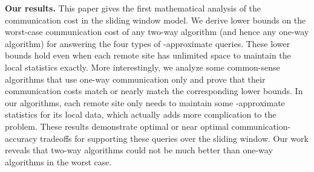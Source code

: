 \documentclass[proceedings]{stacs}
\theoremstyle{definition}\newtheorem{fact}{Fact}
\begin{document}
\vspace{0.5ex}
{\bf Our results.}
This paper gives the first mathematical analysis of
the communication cost in the sliding window model.
We derive
lower bounds on the worst-case communication cost
of any two-way
algorithm (and hence any one-way algorithm) for answering the four types
of -approximate queries.
These lower bounds hold even when each remote site
has unlimited space to maintain the local statistics exactly.
More interestingly, we analyze
some common-sense algorithms that use one-way communication only
and prove that their communication costs
match or nearly match the corresponding lower bounds.
In our algorithms, each remote site only needs to
maintain some -approximate statistics for its local data,
which actually adds more complication
to the problem.
These results demonstrate optimal or near optimal
communication-accuracy tradeoffs for supporting these queries
over the sliding window.
Our work reveals that
two-way algorithms could not
be much better than one-way algorithms in the worst case.


\renewcommand{\baselinestretch}{0.9}
\begin{table}\small
{}
\end{table}
\renewcommand{\baselinestretch}{1}
\end{document}
